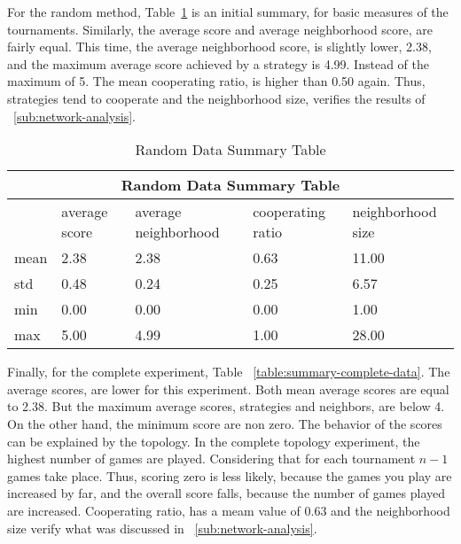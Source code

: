 For the random method, Table~\ref{summary-random-data} is an initial summary,
for basic measures of the tournaments. Similarly, the average score and average
neighborhood score, are fairly equal. This time, the average neighborhood score,
is slightly lower, 2.38, and the maximum average score achieved by a strategy
is 4.99. Instead of the maximum of 5. The mean cooperating ratio, is higher
than 0.50 again. Thus, strategies tend to cooperate and the neighborhood size,
verifies the results of ~\ref{sub:network-analysis}.

\begin{table}[!hbtp]
	\centering
	\begin{adjustbox}{width=0.8\textwidth}
		\small
		\begin{tabular}{|l|l|l|l|l|}
			\hline
			\multicolumn{5}{|c|}{Random Data Summary Table}                                      \\ \hline
			     & average score & average neighborhood & cooperating ratio & neighborhood size \\ \hline
			mean & 2.38          & 2.38                 & 0.63              & 11.00             \\ \hline
			std  & 0.48          & 0.24                 & 0.25              & 6.57              \\ \hline
			min  & 0.00          & 0.00                 & 0.00              & 1.00              \\ \hline
			max  & 5.00          & 4.99                 & 1.00              & 28.00             \\ \hline
		\end{tabular}
	\end{adjustbox}
	\caption{Random Data Summary Table}
	\label{summary-random-data}
\end{table}

Finally, for the complete experiment, Table ~\ref{table:summary-complete-data}. The
average scores, are lower for this experiment. Both mean average scores are
equal to 2.38. But the maximum average scores, strategies and neighbors, are
below 4. On the other hand, the minimum score are non zero. The behavior of the
scores can be explained by the topology. In the complete topology experiment,
the highest number of games are played. Considering that for each tournament
\(n-1\) games take place. Thus, scoring zero is less likely, because the games
you play are increased by far, and the overall score falls, because the number
of games played are increased.
Cooperating ratio, has a meam value of 0.63 and the neighborhood size
verify what was discussed in ~\autoref{sub:network-analysis}.

